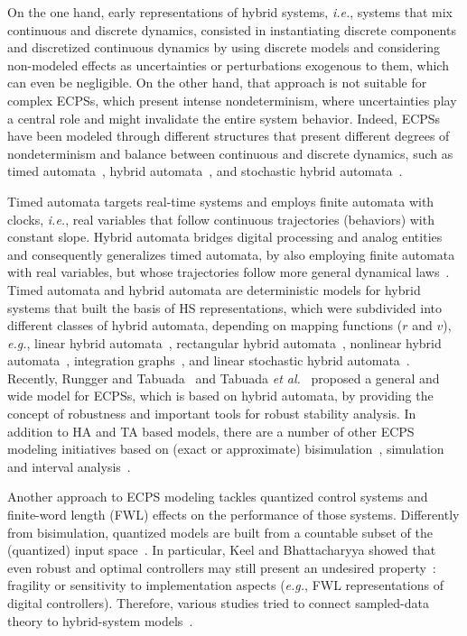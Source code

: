 \documentclass{cta-author}
\begin{document}
On the one hand, early representations of hybrid systems, {\it i.e.}, systems that mix continuous and discrete dynamics, consisted in instantiating discrete components and discretized continuous dynamics by using discrete models and considering non-modeled effects as uncertainties or perturbations exogenous to them, which can even be negligible. On the other hand, that approach is not suitable for complex ECPSs, which present intense nondeterminism, where uncertainties play a central role and might invalidate the entire system behavior. Indeed, ECPSs have been modeled through different structures that present different degrees of nondeterminism and balance between continuous and discrete dynamics, such as timed automata~\cite{Alur94}, hybrid automata~\cite{Alur93,Henzinger95}, and stochastic hybrid automata~\cite{Julius09,Ghosh05,Pola03}.

Timed automata targets real-time systems and employs finite automata with clocks, {\it i.e.}, real variables that follow continuous trajectories (behaviors) with constant slope. Hybrid automata bridges digital processing and analog entities and consequently generalizes timed automata, by also employing finite automata with real variables, but whose trajectories follow more general dynamical laws~\cite{Henzinger95}.  Timed automata and hybrid automata are deterministic models for hybrid systems that built the basis of HS representations, which were subdivided into different classes of hybrid automata, depending on mapping functions ($r$ and $v$), {\it e.g.}, linear hybrid automata~\cite{Lafferriere99}, rectangular hybrid automata~\cite{Puri94,Henzinger95}, nonlinear hybrid automata~\cite{Henzinger95NL,Broucke1997}, integration graphs~\cite{Kesten1993}, and linear stochastic hybrid automata~\cite{Julius09}. Recently, Rungger and Tabuada~\cite{Rungger16} and Tabuada {\it et al.}~\cite{Tabuada14} proposed a general and wide model for ECPSs, which is based on hybrid automata, by providing the concept of robustness and important tools for robust stability analysis. In addition to HA and TA based models, there are a number of other ECPS modeling initiatives based on (exact or approximate) bisimulation~\cite{Girard11}, simulation~\cite{Rungger13} and interval analysis~\cite{Li16}.

Another approach to ECPS modeling tackles quantized control systems and finite-word length (FWL) effects on the performance of those systems. Differently from bisimulation, quantized models are built from a countable subset of the (quantized) input space~\cite{Tabuada07}. In particular, Keel and Bhattacharyya showed that even robust and optimal controllers may still present an undesired property~\cite{Keel01,bhattacharyya}: fragility or sensitivity to implementation aspects ({\it e.g.}, FWL representations of digital controllers). Therefore, various studies tried to connect sampled-data theory to hybrid-system models~\cite{Bicchi02,Petreczky10,Petreczky07,Ye98}.
\end{document}
